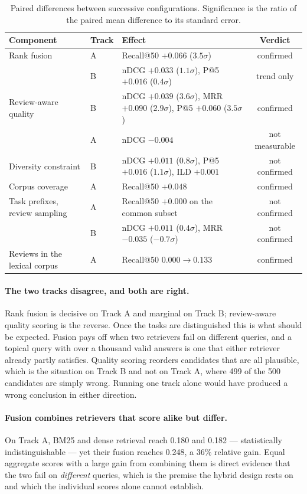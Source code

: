 \begin{table}[h]
\centering
\caption{Paired differences between successive configurations. Significance is
the ratio of the paired mean difference to its standard error.}
\label{tab:attribution}
\small
\begin{tabular}{lllc}
\hline
\textbf{Component} & \textbf{Track} & \textbf{Effect} & \textbf{Verdict} \\
\hline
Rank fusion
  & A & Recall@50 $+0.066$ ($3.5\sigma$) & confirmed \\
  & B & nDCG $+0.033$ ($1.1\sigma$), P@5 $+0.016$ ($0.4\sigma$) & trend only \\[2pt]
Review-aware quality
  & B & nDCG $+0.039$ ($3.6\sigma$), MRR $+0.090$ ($2.9\sigma$), P@5 $+0.060$ ($3.5\sigma$) & confirmed \\
  & A & nDCG $-0.004$ & not measurable \\[2pt]
Diversity constraint
  & B & nDCG $+0.011$ ($0.8\sigma$), P@5 $+0.016$ ($1.1\sigma$), ILD $+0.001$ & not confirmed \\[2pt]
Corpus coverage
  & A & Recall@50 $+0.048$ & confirmed \\[2pt]
Task prefixes, review sampling
  & A & Recall@50 $+0.000$ on the common subset & not confirmed \\
  & B & nDCG $+0.011$ ($0.4\sigma$), MRR $-0.035$ ($-0.7\sigma$) & not confirmed \\[2pt]
Reviews in the lexical corpus
  & A & Recall@50 $0.000 \rightarrow 0.133$ & confirmed \\
\hline
\end{tabular}
\end{table}

\paragraph{The two tracks disagree, and both are right.}
Rank fusion is decisive on Track A and marginal on Track B; review-aware
quality scoring is the reverse. Once the tasks are distinguished this is what
should be expected. Fusion pays off when two retrievers fail on different
queries, and a topical query with over a thousand valid answers is one that
either retriever already partly satisfies. Quality scoring reorders candidates
that are all plausible, which is the situation on Track B and not on Track A,
where 499 of the 500 candidates are simply wrong. Running one track alone would
have produced a wrong conclusion in either direction.

\paragraph{Fusion combines retrievers that score alike but differ.}
On Track A, BM25 and dense retrieval reach 0.180 and 0.182 --- statistically
indistinguishable --- yet their fusion reaches 0.248, a 36\% relative gain.
Equal aggregate scores with a large gain from combining them is direct evidence
that the two fail on \emph{different} queries, which is the premise the hybrid
design rests on and which the individual scores alone cannot establish.

